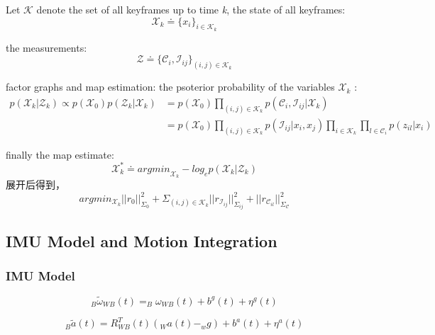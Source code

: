 \documentclass[10pt,a4paper]{article}
\begin{document}
Let $\mathcal{K}$ denote the set of all keyframes up to time \textit{k}, the state of all 
keyframes:
\begin{equation}
\mathcal{X}_k \doteq \{x_i\}_{i\in \mathcal{K}_k}
\end{equation}

the measurements:
\begin{equation}
\mathcal{Z}\doteq \{\mathcal{C}_i, \mathcal{I}_{ij}\}_{(i,j)\in \mathcal{K}_k}
\end{equation}

factor graphs and map estimation:
the psoterior probability of the variables $\mathcal{X}_k$ :
\begin{subequations}
	\begin{align}
	p(\mathcal{X}_k|\mathcal{Z}_k) \varpropto p(\mathcal{X}_0) p(\mathcal{Z}_k | \mathcal{X}_k)
	&=  p(\mathcal{X}_0) \prod_{(i,j)\in \mathcal{K}_k} p(\mathcal{C}_i, \mathcal{I}_{ij}|\mathcal{X}_k)\\
	&=  p(\mathcal{X}_0) \prod_{(i,j)\in \mathcal{K}_k} p(\mathcal{I}_{ij}|x_i, x_j) 
	\prod_{i\in \mathcal{K}_k} \prod_{l \in \mathcal{C}_i} p(z_{il}|x_i)
	\end{align}
\end{subequations}

finally the map estimate:
\begin{equation}
\mathcal{X}_k^* \doteq {argmin}_{\mathcal{X}_k} -log_e p(\mathcal{X}_k|\mathcal{Z}_k)
\end{equation}
展开后得到，
\begin{equation}
argmin_{\mathcal{X}_k} ||r_0||_{\Sigma_0}^2 + \Sigma_{(i,j) \in \mathcal{K}_k}||r_{\mathcal{I}_{ij}}||_{\Sigma_{ij}}^2 + ||r_{\mathcal{C}_{il}}||_{\Sigma_\mathcal{C}}^2
\end{equation}

\subsection{IMU Model and Motion Integration}

\subsubsection{IMU Model}
\begin{equation}
	_{B}\tilde{\omega}_{WB}(t) = _{B}\omega_{WB}(t) + b^g(t) + \eta^g(t)
\end{equation}

\begin{equation}
_B\tilde{a}(t) = R^T_{WB}(t)(_Wa(t) - _wg) + b^a(t) + \eta^a(t)
\end{equation}
\end{document}
